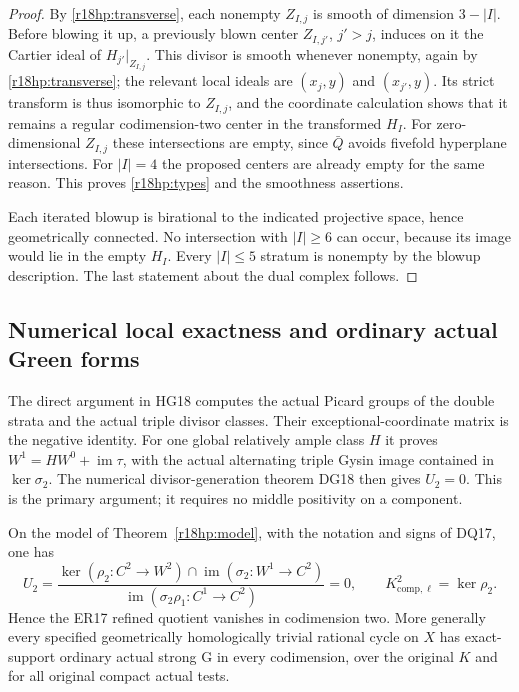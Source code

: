 \begin{proof}
By \eqref{r18hp:transverse}, each nonempty $Z_{I,j}$ is smooth
of dimension $3-|I|$.  Before blowing it up, a previously blown
center $Z_{I,j'}$, $j'>j$, induces on it the Cartier ideal of
$H_{j'}|_{Z_{I,j}}$.  This divisor is smooth whenever nonempty,
again by \eqref{r18hp:transverse}; the relevant local ideals
are $(x_j,y)$ and $(x_{j'},y)$.  Its strict transform is thus
isomorphic to $Z_{I,j}$, and the coordinate calculation shows
that it remains a regular codimension-two center in the
transformed $H_I$.  For zero-dimensional $Z_{I,j}$ these
intersections are empty, since $\bar Q$ avoids fivefold
hyperplane intersections.  For $|I|=4$ the proposed centers
are already empty for the same reason.  This proves
\eqref{r18hp:types} and the smoothness assertions.

Each iterated blowup is birational to the indicated projective
space, hence geometrically connected.  No intersection with
$|I|\ge6$ can occur, because its image would lie in the empty
$H_I$.  Every $|I|\le5$ stratum is nonempty by the blowup
description.  The last statement about the dual complex follows.
\end{proof}

\subsection{Numerical local exactness and ordinary actual Green forms}

The direct argument in HG18 computes the actual Picard groups of
the double strata and the actual triple divisor classes.  Their
exceptional-coordinate matrix is the negative identity.  For one
global relatively ample class $H$ it proves
$W^1=HW^0+\operatorname{im}\tau$, with the actual alternating
triple Gysin image contained in $\ker\sigma_2$.  The numerical
divisor-generation theorem DG18 then gives $U_2=0$.  This is the
primary argument; it requires no middle positivity on a component.

\begin{corollary}
\label{r18hp:U2}
On the model of Theorem~\ref{r18hp:model}, with the notation and
signs of DQ17, one has
\[
 U_2=
 \frac{\ker(\rho_2:C^2\to W^2)\cap
                  \operatorname{im}(\sigma_2:W^1\to C^2)}
      {\operatorname{im}(\sigma_2\rho_1:C^1\to C^2)}=0,
 \qquad K_{\mathrm{comp},\ell}^2=\ker\rho_2.
 \tag{HP18.10}\label{r18hp:U2zero}
\]
Hence the ER17 refined quotient vanishes in codimension two.
More generally every specified geometrically homologically
trivial rational cycle on $X$ has exact-support ordinary actual
strong G in every codimension, over the original $K$ and for
all original compact actual tests.
\end{corollary}

